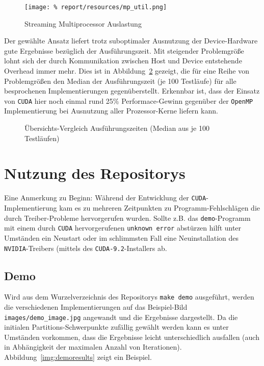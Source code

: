 \documentclass[
    bibliography=totoc, cd=lightcolor, cdmath=false, ngerman]{tudscrreprt}
\begin{document}
\begin{figure}[htbp]
  \begin{center}
    \texttt{[image: \%
    report/resources/mp\_util.png]}
  \end{center}
  \caption{Streaming Multiprocessor Auslastung}
  \label{fig:shm}
\end{figure}

Der gewählte Ansatz liefert trotz suboptimaler Ausnutzung der Device-Hardware
gute Ergebnisse bezüglich der Ausführungszeit. Mit steigender Problemgröße
lohnt sich der durch Kommunikation zwischen Host und Device entstehende
Overhead immer mehr. Dies ist in Abbildung~\ref{fig:all} gezeigt, die für eine
Reihe von Problemgrößen den Median der Ausführungszeit (je 100 Testläufe) für
alle besprochenen Implementierungen gegenüberstellt. Erkennbar ist, dass der
Einsatz von \texttt{CUDA} hier noch einmal rund 25\% Performace-Gewinn gegenüber
der \texttt{OpenMP} Implementierung bei Ausnutzung aller Prozessor-Kerne liefern
kann.

\begin{figure}[htbp]
  \centering
    
  \caption{Übersichts-Vergleich Ausführungszeiten (Median aus je 100 Testläufen)}
  \label{fig:all}
\end{figure}

\chapter{Nutzung des Repositorys}

Eine Anmerkung zu Beginn: Während der Entwicklung der
\texttt{CUDA}-Implementierung kam es zu mehreren Zeitpunkten zu
Programm-Fehlschlägen die durch Treiber-Probleme hervorgerufen wurden. Sollte
z.B. das \texttt{demo}-Programm mit einem durch \texttt{CUDA} hervorgerufenen
\texttt{unknown error} abstürzen hilft unter Umständen ein Neustart oder im
schlimmsten Fall eine Neuinstallation des \texttt{NVIDIA}-Treibers (mittels des
\texttt{CUDA-9.2}-Installers ab.

\section{Demo}

Wird aus dem Wurzelverzeichnis des Repositorys \texttt{make demo} ausgeführt,
werden die verschiedenen Implementierungen auf das Beispiel-Bild
\texttt{images/demo\_image.jpg} angewandt und die Ergebnisse dargestellt. Da
die initialen Partitions-Schwerpunkte zufällig gewählt werden kann es unter
Umständen vorkommen, dass die Ergebnisse leicht unterschiedlich ausfallen
(auch in Abhängigkeit der maximalen Anzahl von Iterationen).
Abbildung~\ref{img:demoresults} zeigt ein Beispiel.
\end{document}
